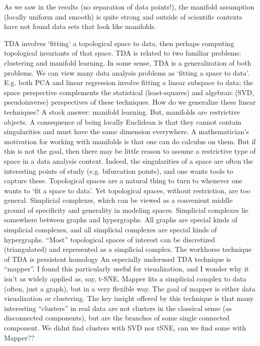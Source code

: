 \documentclass[11pt]{article}
\begin{document}
As we saw in the results (no separation of data points!), the manifold assumption (locally uniform and smooth) is quite strong and outside of scientific contexts have not found data sets that look like manifolds.

TDA involves ‘fitting’ a topological space to data, then perhaps computing topological invariants of that space. TDA is related to two familiar problems: clustering and manifold learning. In some sense, TDA is a generalization of both problems.
We can view many data analysis problems as ‘fitting a space to data’. E.g. both PCA and linear regression involve fitting a linear subspace to data; the space perspective complements the statistical (least-squares) and algebraic (SVD, pseudoinverse) perspectives of these techniques.
How do we generalize these linear techniques? A stock answer: manifold learning. But, manifolds are restrictive objects. A consequence of being locally Euclidean is that they cannot contain singularities and must have the same dimension everywhere. A mathematician’s motivation for working with manifolds is that one can do calculus on them. But if this is not the goal, then there may be little reason to assume a restrictive type of space in a data analysis context. Indeed, the singularities of a space are often the interesting points of study (e.g. bifurcation points), and one wants tools to capture these.
Topological spaces are a natural thing to turn to whenever one wants to ‘fit a space to data’. Yet topological spaces, without restriction, are too general. Simplicial complexes, which can be viewed as a convenient middle ground of specificity and generality in modeling spaces. Simplicial complexes lie somewhere between graphs and hypergraphs. All graphs are special kinds of simplicial complexes, and all simplicial complexes are special kinds of hypergraphs. “Most” topological spaces of interest can be discretized (triangulated) and represented as a simplicial complex.
The workhorse technique of TDA is persistent homology
An especially underused TDA technique is “mapper”. I found this particularly useful for visualization, and I wonder why it isn’t as widely applied as, say, t-SNE. Mapper fits a simplicial complex to data (often, just a graph), but in a very flexible way. The goal of mapper is either data visualization or clustering. The key insight offered by this technique is that many interesting “clusters” in real data are not clusters in the classical sense (as disconnected components), but are the branches of some single connected component. 
We didnt find clusters with SVD nor tSNE, can we find some with Mapper??
\end{document}
